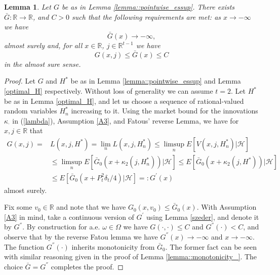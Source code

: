 \documentclass[a4paper]{article}
\newtheorem{lemma}[theorem]{Lemma}
\begin{document}
\begin{lemma}\label{x_bound}
Let $G$ be as in Lemma \ref{lemma::pointwise_essup}. There exists $\bar G : \mathbb{R} \to \mathbb{R}$, and $C>0$ such that the 
following requirements are met: as $x \to -\infty$ we have
$$\bar G(x) \to - \infty,$$
almost surely and, for all $x \in \mathbb{R}$, $j \in \mathbb{R}^{t-1}$ we have 
\begin{equation*}
G(x,j) \leq \bar G(x) \leq C
\end{equation*}
in the almost sure sense. 
\end{lemma}
\begin{proof}
Let $G$ and $H^*$ be as in Lemma \ref{lemma::pointwise_essup} and Lemma \ref{optimal_H} respectively. Without loss of generality we 
can assume $t=2$. Let $H^*$ be as in Lemma \ref{optimal_H}, and let us choose a sequence of rational-valued random variables $H_n^*$ increasing to it. Using the market bound for the innovations $\kappa_{\cdot}$ in (\ref{lambda}), Assumption \ref{A3}, and Fatous'  reverse Lemma, we have for $x,j \in \mathbb{R}$  that
\begin{align*}
G(x,j) =& L(x,j,H^*) =  \lim_{n} L(x,j,H^*_n) \leq \limsup_{n} E[V(x,j,H_n^{*})|\mathcal{H}] 
\\
&\leq \limsup_{n} E[\bar G_0(x +\kappa_2(j, H^*_n))|\mathcal{H}] \leq E[\bar G_0(x +\kappa_2(j, H^*))|\mathcal{H}]
\\
&
\leq
E[\bar G_0(x + P_t^2 \delta_t / 4)| \mathcal{H}] =:G^{'}(x)
\end{align*}
almost surely. 

Fix some $v_0 \in \mathbb{R}$ and note that we have $G_0(x,v_0) \leq \bar{G}_0(x)$. With Assumption \ref{A3} in mind, 
take a continuous version of $G^{'}$ using Lemma \ref{szeder}, and denote it by $G^{''}$. By construction for a.e. $\omega\in \Omega$ we have $G(\cdot,\cdot) \leq C$ and $G^{''}(\cdot) < C$, and observe that by the reverse Fatou lemma we have $G^{''}(x) \to -\infty$ and $x \to -\infty$. The function $G^{''}(\cdot)$ inherits monotonicity from $\bar G_0$. The former fact can be seen with similar reasoning given in the proof of Lemma \ref{lemma::monotonicity_}. The choice $\bar G = G^{''}$ completes the proof.
\end{proof}
\end{document}
